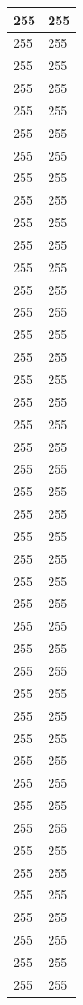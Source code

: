 \documentclass{article}
\begin{document}
\begin{longtable}{|p{4cm}|p{4cm}|}
255 & 255 \\ \hline
255 & 255 \\ \hline
255 & 255 \\ \hline
255 & 255 \\ \hline
255 & 255 \\ \hline
255 & 255 \\ \hline
255 & 255 \\ \hline
255 & 255 \\ \hline
255 & 255 \\ \hline
255 & 255 \\ \hline
255 & 255 \\ \hline
255 & 255 \\ \hline
255 & 255 \\ \hline
255 & 255 \\ \hline
255 & 255 \\ \hline
255 & 255 \\ \hline
255 & 255 \\ \hline
255 & 255 \\ \hline
255 & 255 \\ \hline
255 & 255 \\ \hline
255 & 255 \\ \hline
255 & 255 \\ \hline
255 & 255 \\ \hline
255 & 255 \\ \hline
255 & 255 \\ \hline
255 & 255 \\ \hline
255 & 255 \\ \hline
255 & 255 \\ \hline
255 & 255 \\ \hline
255 & 255 \\ \hline
255 & 255 \\ \hline
255 & 255 \\ \hline
255 & 255 \\ \hline
255 & 255 \\ \hline
255 & 255 \\ \hline
255 & 255 \\ \hline
255 & 255 \\ \hline
255 & 255 \\ \hline
255 & 255 \\ \hline
255 & 255 \\ \hline
255 & 255 \\ \hline
255 & 255 \\ \hline
255 & 255 \\ \hline
255 & 255 \\ \hline

\end{longtable}
\end{document}
